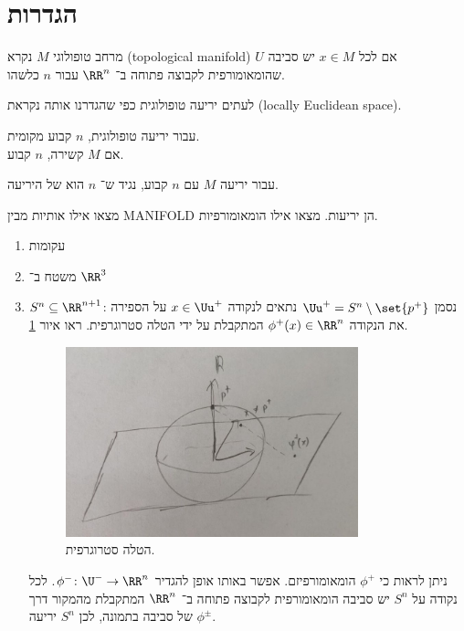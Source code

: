 \documentclass[a4paper,10pt,twoside,openany]{book}
\begin{document}
\section{הגדרות}
\begin{definition}
מרחב טופולוגי
$M$
נקרא
\textenglish{(topological manifold)}
אם לכל
$x \in M$
יש סביבה
$U$
שהומאומורפית לקבוצה פתוחה ב־%
$\RR^n$
עבור
$n$
כלשהו.
\end{definition}
\begin{remark}
לעתים יריעה טופולוגית כפי שהגדרנו אותה נקראת
\textenglish{(locally Euclidean space)}.
\end{remark}
\begin{fact}
עבור יריעה טופולוגית,
$n$
קבוע מקומית.
\\
אם
$M$
קשירה,
$n$
קבוע.
\end{fact}
\begin{definition}
עבור יריעה
$M$
עם
$n$
קבוע, נגיד ש־%
$n$
הוא
של היריעה.
\end{definition}
\begin{exercise}
מצאו אילו אותיות מבין
\textenglish{MANIFOLD}
הן יריעות. מצאו אילו הומאומורפיות.
\end{exercise}
\begin{examples}
\begin{enumerate}
\item עקומות
\item משטח ב־%
$\RR^3$
\item $S^n \subseteq \RR^{n+1}$:
נסמן
$\Uu^+ = S^n \setminus \set{p^+}$
נתאים לנקודה
$x \in \Uu^+$
על הספירה את הנקודה
$\phi^{+}(x) \in \RR^n$
המתקבלת על ידי הטלה סטרוגרפית. ראו איור
\ref{fig2}.
\begin{figure}[ht]
\centering
\caption{הטלה סטרוגרפית.}
\label{fig2}
\includegraphics[width=0.8\textwidth]{sources/figure2}
\end{figure}
ניתן לראות כי
$\phi^+$
הומאומורפיזם.
אפשר באותו אופן להגדיר
$\phi^{-} \colon \U^{-} \to \RR^n$.
לכל נקודה על
$S^n$
יש סביבה הומאומורפית לקבוצה פתוחה ב־%
$\RR^n$
המתקבלת מהמקור דרך
$\phi^{\pm}$
של סביבה בתמונה, לכן
$S^n$
יריעה.
\end{enumerate}
\end{examples}
\end{document}
